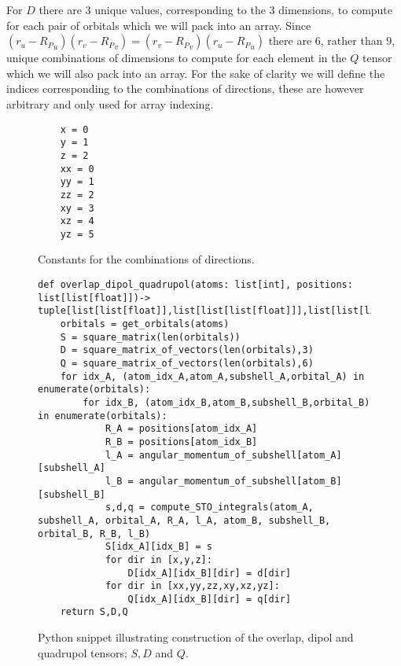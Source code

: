 For $D$ there are $3$ unique values, corresponding to the $3$ dimensions, to compute for each pair of orbitals which we will pack into an array. 
Since $(r_u-{R_P}_u)(r_v-{R_P}_v)=(r_v-{R_P}_v)(r_u-{R_P}_u)$ there are $6$, rather than $9$, unique combinations of dimensions to compute for each element in the $Q$ tensor which we will also pack into an array.
For the sake of clarity we will define the indices corresponding to the combinations of directions, these are however arbitrary and only used for array indexing.  
\begin{figure}[H]
\begin{verbatim}
    x = 0
    y = 1
    z = 2
    xx = 0
    yy = 1
    zz = 2
    xy = 3
    xz = 4
    yz = 5
\end{verbatim}
\caption{Constants for the combinations of directions.}
\end{figure}
\begin{figure}[H]
\begin{verbatim}
def overlap_dipol_quadrupol(atoms: list[int], positions: list[list[float]])-> tuple[list[list[float]],list[list[list[float]]],list[list[list[float]]]]:
    orbitals = get_orbitals(atoms)
    S = square_matrix(len(orbitals))
    D = square_matrix_of_vectors(len(orbitals),3)
    Q = square_matrix_of_vectors(len(orbitals),6)
    for idx_A, (atom_idx_A,atom_A,subshell_A,orbital_A) in enumerate(orbitals):
        for idx_B, (atom_idx_B,atom_B,subshell_B,orbital_B) in enumerate(orbitals):
            R_A = positions[atom_idx_A]
            R_B = positions[atom_idx_B]
            l_A = angular_momentum_of_subshell[atom_A][subshell_A]
            l_B = angular_momentum_of_subshell[atom_B][subshell_B]
            s,d,q = compute_STO_integrals(atom_A, subshell_A, orbital_A, R_A, l_A, atom_B, subshell_B, orbital_B, R_B, l_B)
            S[idx_A][idx_B] = s
            for dir in [x,y,z]:
                D[idx_A][idx_B][dir] = d[dir]
            for dir in [xx,yy,zz,xy,xz,yz]:
                Q[idx_A][idx_B][dir] = q[dir]
    return S,D,Q
\end{verbatim}
\caption{Python snippet illustrating construction of the overlap, dipol and quadrupol tensors; $S,D$ and $Q$.}
\end{figure}

